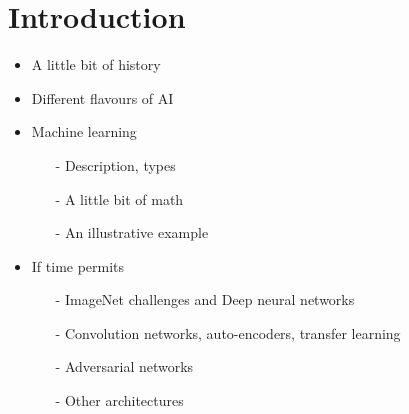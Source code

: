\section{Introduction}
\begin{frame}{}
	\begin{itemize}
		\item A little bit of history
		\item Different flavours of AI 
		\item Machine learning
		\begin{itemize}
			\item[-] Description, types 
			\item[-]A little bit of math 
			\item[-] An illustrative example
		\end{itemize}
		\item If time permits 
		\begin{itemize}
			\item[-] ImageNet challenges and Deep neural networks 
			\item[-] Convolution networks, auto-encoders, transfer learning
			\item[-] Adversarial networks 
			\item[-] Other architectures 
		\end{itemize}
	\end{itemize}
\end{frame}

